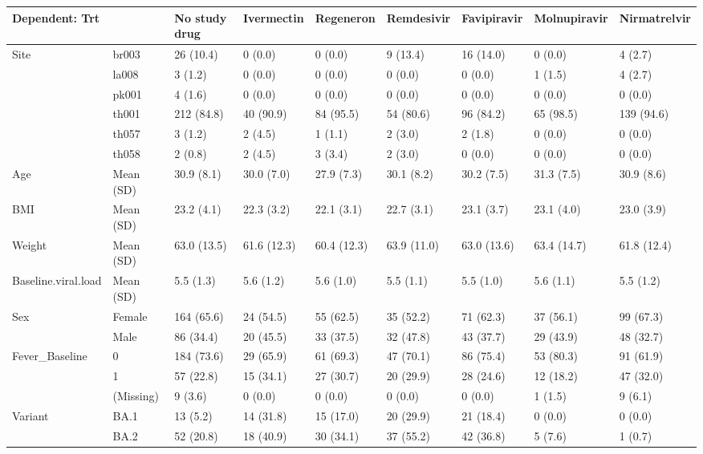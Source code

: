 
\begin{tabular}{l|l|l|l|l|l|l|l|l}
\hline
Dependent: Trt &   & No study drug & Ivermectin & Regeneron & Remdesivir & Favipiravir & Molnupiravir & Nirmatrelvir\\
\hline
Site & br003 & 26 (10.4) & 0 (0.0) & 0 (0.0) & 9 (13.4) & 16 (14.0) & 0 (0.0) & 4 (2.7)\\
\hline
 & la008 & 3 (1.2) & 0 (0.0) & 0 (0.0) & 0 (0.0) & 0 (0.0) & 1 (1.5) & 4 (2.7)\\
\hline
 & pk001 & 4 (1.6) & 0 (0.0) & 0 (0.0) & 0 (0.0) & 0 (0.0) & 0 (0.0) & 0 (0.0)\\
\hline
 & th001 & 212 (84.8) & 40 (90.9) & 84 (95.5) & 54 (80.6) & 96 (84.2) & 65 (98.5) & 139 (94.6)\\
\hline
 & th057 & 3 (1.2) & 2 (4.5) & 1 (1.1) & 2 (3.0) & 2 (1.8) & 0 (0.0) & 0 (0.0)\\
\hline
 & th058 & 2 (0.8) & 2 (4.5) & 3 (3.4) & 2 (3.0) & 0 (0.0) & 0 (0.0) & 0 (0.0)\\
\hline
Age & Mean (SD) & 30.9 (8.1) & 30.0 (7.0) & 27.9 (7.3) & 30.1 (8.2) & 30.2 (7.5) & 31.3 (7.5) & 30.9 (8.6)\\
\hline
BMI & Mean (SD) & 23.2 (4.1) & 22.3 (3.2) & 22.1 (3.1) & 22.7 (3.1) & 23.1 (3.7) & 23.1 (4.0) & 23.0 (3.9)\\
\hline
Weight & Mean (SD) & 63.0 (13.5) & 61.6 (12.3) & 60.4 (12.3) & 63.9 (11.0) & 63.0 (13.6) & 63.4 (14.7) & 61.8 (12.4)\\
\hline
Baseline.viral.load & Mean (SD) & 5.5 (1.3) & 5.6 (1.2) & 5.6 (1.0) & 5.5 (1.1) & 5.5 (1.0) & 5.6 (1.1) & 5.5 (1.2)\\
\hline
Sex & Female & 164 (65.6) & 24 (54.5) & 55 (62.5) & 35 (52.2) & 71 (62.3) & 37 (56.1) & 99 (67.3)\\
\hline
 & Male & 86 (34.4) & 20 (45.5) & 33 (37.5) & 32 (47.8) & 43 (37.7) & 29 (43.9) & 48 (32.7)\\
\hline
Fever\_Baseline & 0 & 184 (73.6) & 29 (65.9) & 61 (69.3) & 47 (70.1) & 86 (75.4) & 53 (80.3) & 91 (61.9)\\
\hline
 & 1 & 57 (22.8) & 15 (34.1) & 27 (30.7) & 20 (29.9) & 28 (24.6) & 12 (18.2) & 47 (32.0)\\
\hline
 & (Missing) & 9 (3.6) & 0 (0.0) & 0 (0.0) & 0 (0.0) & 0 (0.0) & 1 (1.5) & 9 (6.1)\\
\hline
Variant & BA.1 & 13 (5.2) & 14 (31.8) & 15 (17.0) & 20 (29.9) & 21 (18.4) & 0 (0.0) & 0 (0.0)\\
\hline
 & BA.2 & 52 (20.8) & 18 (40.9) & 30 (34.1) & 37 (55.2) & 42 (36.8) & 5 (7.6) & 1 (0.7)\\

\end{tabular}
